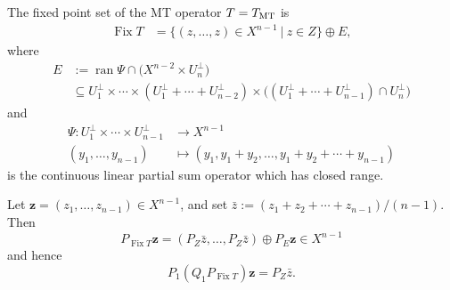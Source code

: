 \documentclass[10pt,a4paper]{amsart}
\newcommand{\Fix}{\ensuremath{\operatorname{Fix}}}
\newcommand{\bz}{\ensuremath{\mathbf{z}}}
\newcommand{\menge}[2]{\big\{{#1}~\big |~{#2}\big\}}
\newcommand{\ran}{\ensuremath{\operatorname{ran}}}
\newcommand{\tmt}{\ensuremath{T_{\text{\scriptsize MT}}}}
\begin{document}
\begin{lemma}
\label{mtfixlemma}
The fixed point set of the MT operator $T=\tmt$ is 
\begin{align}
\label{e:210817e}
\Fix T &= \menge{(z,\ldots,z)\in X^{n-1}}{z\in Z} \oplus E,
\end{align}
where 
\begin{subequations}
\label{e:bloodyE}
\begin{align}
E &:= 
\ran\Psi \cap \big(X^{n-2}\times U_n^\perp)\\
&\subseteq 
U_1^\perp \times 
\cdots
\times (U_1^\perp+\cdots+U_{n-2}^\perp)
\times \big((U_1^\perp+\cdots+U_{n-1}^\perp)\cap U_n^\perp\big)
\end{align}
\end{subequations}
and 
\begin{subequations}
\label{e:bloodyPsi}
\begin{align}
\Psi\colon U_1^\perp \times \cdots \times U_{n-1}^\perp
&\to X^{n-1}\\
(y_1,\ldots,y_{n-1})&\mapsto 
(y_1,y_1+y_2,\ldots,y_1+y_2+\cdots+y_{n-1})
\end{align}
\end{subequations}
 is the continuous linear partial sum operator which has closed range. 

Let $\bz = (z_1,\ldots,z_{n-1})\in X^{n-1}$,
and set $\bar{z} := (z_1+z_2+\cdots+z_{n-1})/(n-1)$.
Then
\begin{equation}
\label{e:210817d}
P_{\Fix T}\bz = (P_Z\bar{z},\ldots,P_Z\bar{z}) \oplus P_E\bz \in X^{n-1}
\end{equation}
and hence 
\begin{equation}
\label{e:210817g}
P_1(Q_1P_{\Fix T})\bz = P_Z\bar{z}.
\end{equation}

\end{lemma}
\end{document}
